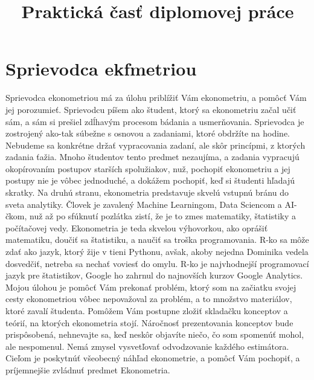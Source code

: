 \makeatletter
\def\maxwidth{\ifdim\Gin@nat@width>\linewidth\linewidth\else\Gin@nat@width\fi}
\def\maxheight{\ifdim\Gin@nat@height>\textheight\textheight\else\Gin@nat@height\fi}
\makeatother

\title{Praktická časť diplomovej práce}
\author{}
\date{\vspace{-2.5em}}



\maketitle

\hypertarget{sprievodca-ekfmetriou}{%
\section{Sprievodca ekfmetriou}\label{sprievodca-ekfmetriou}}

Sprievodca ekonometriou má za úlohu priblížiť Vám ekonometriu, a pomôcť
Vám jej porozumieť. Sprievodcu píšem ako študent, ktorý sa ekonometriu
začal učiť sám, a sám si prešiel zdĺhavým procesom bádania a
usmerňovania. Sprievodca je zostrojený ako-tak súbežne s osnovou a
zadaniami, ktoré obdržíte na hodine. Nebudeme sa konkrétne držať
vypracovania zadaní, ale skôr princípmi, z ktorých zadania ťažia. Mnoho
študentov tento predmet nezaujíma, a zadania vypracujú okopírovaním
postupov starších spolužiakov, nuž, pochopiť ekonometriu a jej postupy
nie je vôbec jednoduché, a dokážem pochopiť, keď si študenti hľadajú
skratky. Na druhú stranu, ekonometria predstavuje skvelú vstupnú bránu
do sveta analytiky. Človek je zavalený Machine Learningom, Data Sciencom
a AI-čkom, nuž až po sfúknutí pozlátka zistí, že je to zmes matematiky,
štatistiky a počítačovej vedy. Ekonometria je teda skvelou výhovorkou,
ako oprášiť matematiku, doučiť sa štatistiku, a naučiť sa troška
programovania. R-ko sa môže zdať ako jazyk, ktorý žije v tieni Pythonu,
avšak, akoby nejedna Dominika vedela dosvedčiť, netreba sa nechať
voviesť do omylu. R-ko je najvhodnejší programovací jazyk pre
štatistikov, Google ho zahrnul do najnovších kurzov Google Analytics.
Mojou úlohou je pomôcť Vám prekonať problém, ktorý som na začiatku
svojej cesty ekonometriou vôbec nepovažoval za problém, a to množstvo
materiálov, ktoré zavalí študenta. Pomôžem Vám postupne zložiť skladačku
konceptov a teórií, na ktorých ekonometria stojí. Náročnosť
prezentovania konceptov bude prispôsobená, nehnevajte sa, keď neskôr
objavíte niečo, čo som spomenúť mohol, ale nespomenul. Nemá zmysel
vysvetľovať odvodzovanie každého estimátora. Cieľom je poskytnúť
všeobecný náhľad ekonometrie, a pomôcť Vám pochopiť, a príjemnejšie
zvládnuť predmet Ekonometria.


